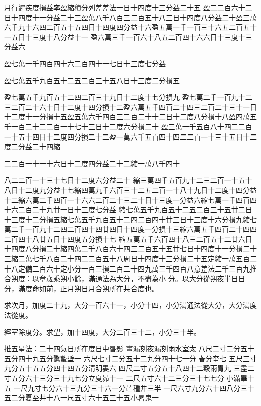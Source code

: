 \begin{pinyinscope}
 月行遲疾度損益率盈縮積分列差差法一日十四度十三分益二十五
 盈二二百六十二日十四度十一分益二十三盈萬八千八百三二百五十八三日十四度八分益二十盈三萬六千九十六四二百五十五四日十四度四分益十六盈五萬一千一百三十六五二百五十一五日十三度十八分益十一
 盈六萬三千一百六十八五二百四十六六日十三度十三分益六



 盈七萬一千四百四十六二百四十一七日十三度七分益



 盈七萬五千九百五十二五二百三十五八日十三度二分損五



 盈七萬五千九百五十二四二百三十九日十二度十七分損九
 盈七萬二千一百九十二三二百二十六十日十二度十四分損十二盈六萬五千四百二十四三二百二十三十一日十二度十一分損十五盈五萬六千四百三二百二十十二日十二度八分損十八盈四萬五千一百二十二二百一十七十三日十二度六分損二十
 盈三萬一千五百八十四二二百一十五十四日十二度四分損二十二盈一萬六千五百四十四二二百一十三十五日十二度二分益二十四縮



 二二百一十一十六日十二度四分益二十二縮一萬八千四十



 八二二百一十三十七日十二度六分益二十
 縮三萬四千五百九十二三二百一十五十八日十二度九分益十七縮四萬九千六百三十二五二百一十八十九日十二度十四分益十二縮六萬二千四百一十六六二百二十三二十日十三度一分益六縮七萬一千四百四十六二百二十九廿一日十三度七分益
 縮七萬五千九百五十二五二百三十五廿二日十三度十二分損五縮七萬五千九百五十二四二百四十廿三日十三度十六分損九縮七萬二千一百九十二四二百四十四廿四日十四度一分損十三縮六萬五千四百二十四四二百四十八廿五日十四度五分損十七
 縮五萬五千六百四十八三二百五十二廿六日十四度八分損二十縮四萬二千八百六十四三二百五十五廿七日十四度十一分損二十三縮二萬七千八百二十四二二百五十八周日十四度十三分損二十五定縮一萬五百二十八定備二百六十定小分一百三損二百二十四九萬三千四百八意差法二千三百九推合朔度：以章歲乘朔小餘，滿通法為大分，不盡為小
 分。以大分從朔夜半日日分，滿度命如前，正月朔日月合朔所在共合度也。



 求次月，加度二十九，大分一百六十一，小分十四，小分滿通法從大分，大分滿度法從度。


經室除度分。求望，加十四度，大分二百三十二，小分三十半。


推五星法：二十四氣日所在度日中晷影
 晝漏刻夜漏刻雨水室太
 八尺二寸二分五十五分四十九五分驚蟄壁一
 六尺七寸二分五十二九分四十七一分
 春分奎七
 五尺三寸九分五十五五分四十四五分清明婁六
 四尺二寸五分五十八四十二穀雨胃九
 三盡二寸五分六十三分三十九七分立夏昴十一
 二尺五寸六十二三分三十七七分
 小滿畢十五
 一尺九寸七分六十三九分三十六一分芒種井三半
 一尺六寸九分六十四八分三十五二分夏至井十八一尺五寸六十五三十五小暑鬼一



\end{pinyinscope}
